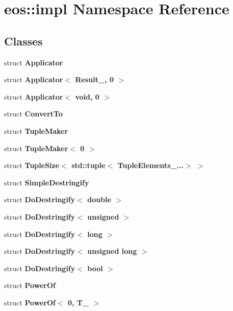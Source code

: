 \hypertarget{namespaceeos_1_1impl}{
\section{eos::impl Namespace Reference}
\label{namespaceeos_1_1impl}
}
\subsection*{Classes}
\begin{DoxyCompactItemize}
\item 
struct {\bfseries Applicator}
\item 
struct {\bfseries Applicator$<$ Result\_\-, 0 $>$}
\item 
struct {\bfseries Applicator$<$ void, 0 $>$}
\item 
struct {\bfseries ConvertTo}
\item 
struct {\bfseries TupleMaker}
\item 
struct {\bfseries TupleMaker$<$ 0 $>$}
\item 
struct {\bfseries TupleSize$<$ std::tuple$<$ TupleElements\_\-...$>$ $>$}
\item 
struct {\bfseries SimpleDestringify}
\item 
struct {\bfseries DoDestringify$<$ double $>$}
\item 
struct {\bfseries DoDestringify$<$ unsigned $>$}
\item 
struct {\bfseries DoDestringify$<$ long $>$}
\item 
struct {\bfseries DoDestringify$<$ unsigned long $>$}
\item 
struct {\bfseries DoDestringify$<$ bool $>$}
\item 
struct {\bfseries PowerOf}
\item 
struct {\bfseries PowerOf$<$ 0, T\_\- $>$}
\end{DoxyCompactItemize}
